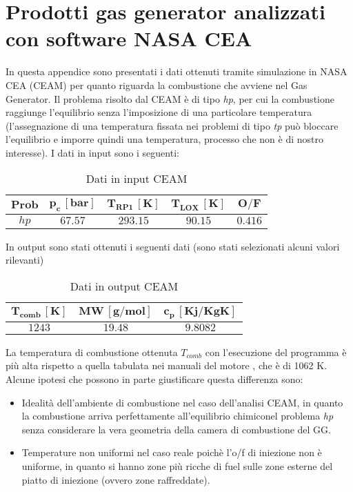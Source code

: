 \section{Prodotti gas generator analizzati con software NASA CEA}
\label{appendix:prodotti_gas_generator}
In questa appendice sono presentati i dati ottenuti tramite simulazione in NASA CEA (CEAM) per quanto riguarda la combustione che avviene nel Gas Generator. Il problema risolto dal CEAM è di tipo \textit{hp}, per cui la combustione raggiunge l'equilibrio senza l'imposizione di una particolare temperatura (l'assegnazione di una temperatura fissata nei problemi di tipo \textit{tp} può bloccare l'equilibrio e imporre quindi una temperatura, processo che non è di nostro interesse). I dati in input sono i seguenti:
\\
\begin{table}[H]

\centering
\begin{tabular}{|c|c|c|c|c|}
\hline
$\bm{Prob}$ & $\bm{p_c \, [bar]}$ & $\bm{T_{RP1} \, [K]}$ & $\bm{T_{LOX} \, [K]}$ & $\bm{O/F}$ \\
\hline
$hp$ & $67.57$ & $293.15$ & $90.15$ & $0.416$ \\
\hline
\end{tabular}
\caption{Dati in input CEAM}
\label{table:input_CEAM}
\end{table}
In output sono stati ottenuti i seguenti dati (sono stati selezionati alcuni valori rilevanti)
\begin{table}[H]

\centering
\begin{tabular}{|c|c|c|}
\hline
$\bm{T_{comb} \, [K]}$ & $\bm{MW \, [g/mol]}$ & $\bm{c_p \, [Kj/KgK]}$ \\
\hline
$1243$ & $19.48$ & $9.8082$\\
\hline
\end{tabular}

\caption{Dati in output CEAM}
\label{table:output_CEAM}

\end{table}
La temperatura di combustione ottenuta $T_{comb}$ con l'esecuzione del programma è più alta rispetto a quella tabulata nei manuali del motore \cite{f-1_manual}, che è di 1062 K. Alcune ipotesi che possono in parte giustificare questa differenza sono:
\begin{itemize}
\item Idealità dell'ambiente di combustione nel caso dell'analisi CEAM, in quanto la combustione arriva perfettamente all'equilibrio chimiconel problema \textit{hp} senza considerare la vera geometria della camera di combustione del GG.
\item Temperature non uniformi nel caso reale poichè l'o/f di iniezione non è uniforme, in quanto si hanno zone più ricche di fuel sulle zone esterne del piatto di iniezione (ovvero zone raffreddate). 
\end{itemize}

